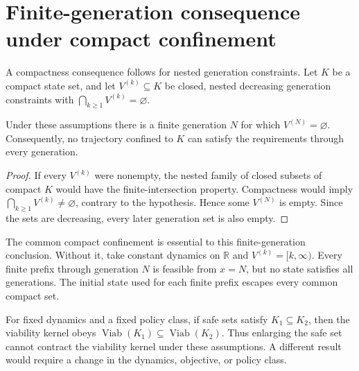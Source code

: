 \section{Finite-generation consequence under compact confinement}\label{si:finitegeneration}

A compactness consequence follows for nested generation constraints. Let $K$ be a compact state set, and let $V^{(k)}\subseteq K$ be closed, nested decreasing generation constraints with $\bigcap_{k\ge1}V^{(k)}=\varnothing$.

\begin{proposition}\label{prop:finitegeneration}
Under these assumptions there is a finite generation $N$ for which $V^{(N)}=\varnothing$. Consequently, no trajectory confined to $K$ can satisfy the requirements through every generation.
\end{proposition}
\begin{proof}
If every $V^{(k)}$ were nonempty, the nested family of closed subsets of compact $K$ would have the finite-intersection property. Compactness would imply $\bigcap_{k\ge1}V^{(k)}\ne\varnothing$, contrary to the hypothesis. Hence some $V^{(N)}$ is empty. Since the sets are decreasing, every later generation set is also empty.
\end{proof}

The common compact confinement is essential to this finite-generation conclusion. Without it, take constant dynamics on $\mathbb R$ and $V^{(k)}=[k,\infty)$. Every finite prefix through generation $N$ is feasible from $x=N$, but no state satisfies all generations. The initial state used for each finite prefix escapes every common compact set.

For fixed dynamics and a fixed policy class, if safe sets satisfy $K_1\subseteq K_2$, then the viability kernel obeys $\operatorname{Viab}(K_1)\subseteq\operatorname{Viab}(K_2)$. Thus enlarging the safe set cannot contract the viability kernel under these assumptions. A different result would require a change in the dynamics, objective, or policy class.

